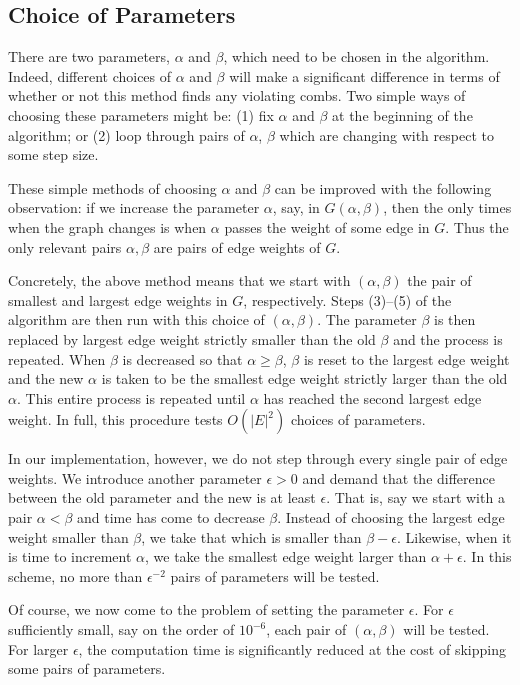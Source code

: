 \documentclass[12pt, letterpaper]{amsart}
\theoremstyle{plain}
\theoremstyle{definition}
\theoremstyle{remark}
\begin{document}
\subsection{Choice of Parameters}
There are two parameters, $\alpha$ and $\beta$, which need to be chosen in the
algorithm. Indeed, different choices of $\alpha$ and $\beta$ will make a
significant difference in terms of whether or not this method finds any
violating combs. Two simple ways of choosing these parameters might be: (1)
fix $\alpha$ and $\beta$ at the beginning of the algorithm; or (2) loop through
pairs of $\alpha$, $\beta$ which are changing with respect to some step size.

These simple methods of choosing $\alpha$ and $\beta$ can be improved with the
following observation: if we increase the parameter $\alpha$, say, in
$G(\alpha,\beta)$, then the only times when the graph changes is when $\alpha$
passes the weight of some edge in $G$. Thus the only relevant pairs
$\alpha,\beta$ are pairs of edge weights of $G$.

Concretely, the above method means that we start with $(\alpha,\beta)$ the pair
of smallest and largest edge weights in $G$, respectively. Steps (3)--(5) of
the algorithm are then run with this choice of $(\alpha,\beta)$. The parameter
$\beta$ is then replaced by largest edge weight strictly smaller than the old
$\beta$ and the process is repeated. When $\beta$ is decreased so that $\alpha
\geq \beta$, $\beta$ is reset to the largest edge weight and the new $\alpha$
is taken to be the smallest edge weight strictly larger than the old $\alpha$.
This entire process is repeated until $\alpha$ has reached the second largest
edge weight. In full, this procedure tests $O(|E|^2)$ choices of parameters.

In our implementation, however, we do not step through every single pair of
edge weights. We introduce another parameter $\epsilon > 0$ and demand that the
difference between the old parameter and the new is at least $\epsilon$. That
is, say we start with a pair $\alpha < \beta$ and time has come to decrease
$\beta$. Instead of choosing the largest edge weight smaller than $\beta$, we
take that which is smaller than $\beta - \epsilon$. Likewise, when it is time
to increment $\alpha$, we take the smallest edge weight larger than $\alpha +
\epsilon$. In this scheme, no more than $\epsilon^{-2}$ pairs of parameters
will be tested.

Of course, we now come to the problem of setting the parameter $\epsilon$. For
$\epsilon$ sufficiently small, say on the order of $10^{-6}$, each pair of
$(\alpha, \beta)$ will be tested. For larger $\epsilon$, the computation time is
significantly reduced at the cost of skipping some pairs of parameters.
\end{document}
